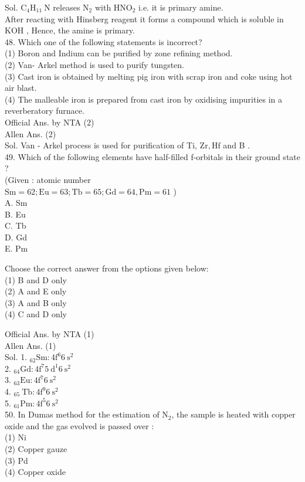 \documentclass[10pt]{article}
\begin{document}
Sol. \(\mathrm{C}_{4} \mathrm{H}_{11} \mathrm{~N}\) releases \(\mathrm{N}_{2}\) with \(\mathrm{HNO}_{2}\) i.e. it is primary amine.\\
After reacting with Hinsberg reagent it forms a compound which is soluble in KOH , Hence, the amine is primary.\\
48. Which one of the following statements is incorrect?\\
(1) Boron and Indium can be purified by zone refining method.\\
(2) Van- Arkel method is used to purify tungsten.\\
(3) Cast iron is obtained by melting pig iron with scrap iron and coke using hot air blast.\\
(4) The malleable iron is prepared from cast iron by oxidising impurities in a reverberatory furnace.\\
Official Ans. by NTA (2)\\
Allen Ans. (2)\\
Sol. Van - Arkel process is used for purification of Ti, \(\mathrm{Zr}, \mathrm{Hf}\) and B .\\
49. Which of the following elements have half-filled f-orbitals in their ground state ?\\
(Given : atomic number\\
\(\mathrm{Sm}=62 ; \mathrm{Eu}=63 ; \mathrm{Tb}=65 ; \mathrm{Gd}=64, \mathrm{Pm}=61\) )\\
A. Sm\\
B. Eu\\
C. Tb\\
D. Gd\\
E. Pm

Choose the correct answer from the options given below:\\
(1) B and D only\\
(2) A and E only\\
(3) A and B only\\
(4) C and D only

Official Ans. by NTA (1)\\
Allen Ans. (1)\\
Sol. 1. \({ }_{62} \mathrm{Sm}: 4 \mathrm{f}^{6} 6 \mathrm{~s}^{2}\)\\
2. \({ }_{64} \mathrm{Gd}: 4 \mathrm{f}^{7} 5 \mathrm{~d}^{1} 6 \mathrm{~s}^{2}\)\\
3. \({ }_{63} \mathrm{Eu}: 4 \mathrm{f}^{7} 6 \mathrm{~s}^{2}\)\\
4. \({ }_{65} \mathrm{~Tb}: 4 \mathrm{f}^{9} 6 \mathrm{~s}^{2}\)\\
5. \({ }_{61} \mathrm{Pm}: 4 \mathrm{f}^{5} 6 \mathrm{~s}^{2}\)\\
50. In Dumas method for the estimation of \(\mathrm{N}_{2}\), the sample is heated with copper oxide and the gas evolved is passed over :\\
(1) Ni\\
(2) Copper gauze\\
(3) Pd\\
(4) Copper oxide
\end{document}
